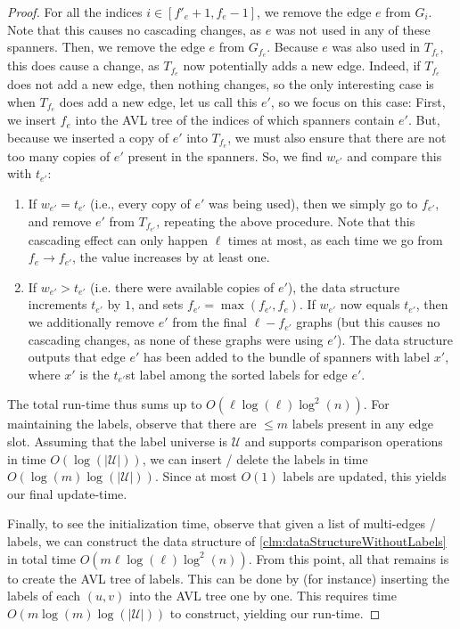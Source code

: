 \documentclass{article}
\begin{document}
\begin{proof}
    For all the indices $i \in [f'_e + 1, f_e - 1]$, we remove the edge $e$ from $G_i$. Note that this causes no cascading changes, as $e$ was not used in any of these spanners. Then, we remove the edge $e$ from $G_{f_e}$. Because $e$ was also used in $T_{f_e}$, this does cause a change, as $T_{f_e}$ now potentially adds a new edge. Indeed, if $T_{f_e}$ does not add a new edge, then nothing changes, so the only interesting case is when $T_{f_e}$ does add a new edge, let us call this $e'$, so we focus on this case: First, we insert $f_e$ into the AVL tree of the indices of which spanners contain $e'$. But, because we inserted a copy of $e'$ into $T_{f_e}$, we must also ensure that there are not too many copies of $e'$ present in the spanners. So, we find $w_{e'}$ and compare this with $t_{e'}$:
    \begin{enumerate}
        \item If $w_{e'} = t_{e'}$ (i.e., every copy of $e'$ was being used), then we simply go to $f_{e'}$, and remove $e'$ from $T_{f_{e'}}$, repeating the above procedure.
        Note that this cascading effect can only happen $\ell$ times at most, as each time we go from $f_e \rightarrow f_{e'}$, the value increases by at least one. 
        \item If $w_{e'} > t_{e'}$ (i.e. there were available copies of $e'$), the data structure increments $t_{e'}$ by $1$, and sets $f_{e'} = \max(f_{e'}, f_e)$. If $w_{e'}$ now equals $t_{e'}$, then we additionally remove $e'$ from the final $\ell - f_{e'}$ graphs (but this causes no cascading changes, as none of these graphs were using $e'$). The data structure outputs that edge $e'$ has been added to the bundle of spanners with label $x'$, where $x'$ is the $t_{e'}$st label among the sorted labels for edge $e'$.
    \end{enumerate}
    
    The total run-time thus sums up to $O(\ell \log(\ell) \log^2(n))$. For maintaining the labels, observe that there are $\leq m$ labels present in any edge slot. Assuming that the label universe is $\mathcal{U}$ and supports comparison operations in time $O(\log(|\mathcal{U}|))$, we can insert / delete the labels in time $O(\log(m) \log(|\mathcal{U}|))$. Since at most $O(1)$ labels are updated, this yields our final update-time. 

    Finally, to see the initialization time, observe that given a list of multi-edges / labels, we can construct the data structure of \cref{clm:dataStructureWithoutLabels} in total time $O(m \ell \log(\ell) \log^2(n))$. From this point, all that remains is to create the AVL tree of labels. This can be done by (for instance) inserting the labels of each $(u,v)$ into the AVL tree one by one. This requires time $O(m \log(m) \log(|\mathcal{U}|))$ to construct, yielding our run-time. 
\end{proof}
\end{document}
